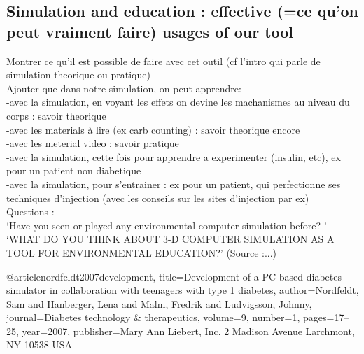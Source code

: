 \subsection{Simulation and education : effective (=ce qu'on peut vraiment faire) usages of our tool}
\label{sec:simulationUsages}
Montrer ce qu'il est possible de faire avec cet outil (cf l'intro qui parle de simulation theorique ou pratique)\\
Ajouter que dans notre simulation, on peut apprendre:\\
-avec la simulation, en voyant les effets on devine les machanismes au niveau du corps : savoir theorique\\
-avec les materials à lire (ex carb counting) : savoir theorique encore\\
-avec les meterial video : savoir pratique\\
-avec la simulation, cette fois pour apprendre a experimenter (insulin, etc), ex pour un patient non diabetique\\
-avec la simulation, pour s'entrainer : ex pour un patient, qui perfectionne ses techniques d'injection (avec les conseils sur les sites d'injection par ex)\\

Questions :\\
`Have you seen or played any environmental computer simulation before? '
`WHAT DO YOU THINK ABOUT 3-D COMPUTER SIMULATION AS A TOOL FOR ENVIRONMENTAL EDUCATION?'
(Source :...)%

\cite{pmid17316094} %


@article{nordfeldt2007development,
  title={Development of a PC-based diabetes simulator in collaboration with teenagers with type 1 diabetes},
  author={Nordfeldt, Sam and Hanberger, Lena and Malm, Fredrik and Ludvigsson, Johnny},
  journal={Diabetes technology \& therapeutics},
  volume={9},
  number={1},
  pages={17--25},
  year={2007},
  publisher={Mary Ann Liebert, Inc. 2 Madison Avenue Larchmont, NY 10538 USA}
}


